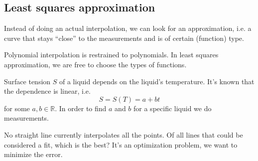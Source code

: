 \subsection{Least squares approximation}

Instead of doing an actual interpolation, we can look for an approximation, i.e. a curve that stays
``close'' to the measurements and is of certain (function) type.

Polynomial interpolation is restrained to polynomials. In least squares
approximation, we are free to choose the types of functions.

\begin{example}
    Surface tension $S$ of a liquid depends on the liquid's temperature. It's known that the dependence is linear, i.e.
    \[ S = S(T) = a + bt \]
    for some $a, b \in \mathbb{R}$. In order to find $a$ and $b$ for a specific liquid we do measurements.
    \begin{center}   
    \end{center}
    No straight line currently interpolates all the points.
    Of all lines that could be considered a fit, which is the best?
    It's an optimization problem, we want to minimize the error.


\end{example}

